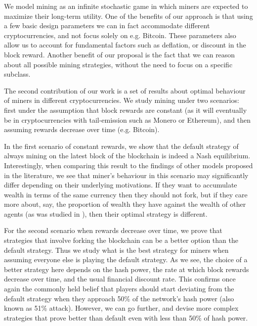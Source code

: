 \smallskip
{}  We model mining as an infinite stochastic game in which miners are expected to maximize their long-term utility. One of the benefits of our approach is that using  a few basic design parameters we can in fact accommodate different cryptocurrencies, and not focus solely on e.g. Bitcoin. These parameters also allow us to account for fundamental factors such as deflation, or discount in the block reward. Another benefit of our proposal is the fact that we can reason about all possible mining strategies, without the need to focus on a specific subclass. 

The second contribution of our work is a set of results about optimal behaviour of miners in different cryptocurrencies. We study mining under two scenarios: 
first under the assumption that block rewards are constant (as it will eventually be in cryptocurrencies with tail-emission such as Monero or Ethereum), and then 
assuming rewards decrease over time (e.g. Bitcoin). 

In the first scenario of constant rewards, we show that the default strategy of always mining on the latest block of the blockchain is indeed a Nash equilibrium. Interestingly, when comparing this result to the findings of other models proposed in the literature, we see that miner's behaviour in this scenario may significantly differ depending on their underlying motivations. If they want to accumulate wealth in terms of the same currency then they should not fork, but if they care more about, say, the proportion of wealth they have against the wealth of other agents (as was studied in \cite{mininggames:2016}), then their optimal strategy is different. 

For the second scenario when rewards decrease over time, we prove that strategies that involve forking the blockchain
can be a better option than the default strategy. 
Thus we study what is the best strategy for miners when assuming everyone else is playing the default strategy. As we see, the 
choice of a better strategy here depends on the hash power, the rate at which 
block rewards decrease over time, and the usual financial discount rate. This confirms once again the commonly held belief that
players should start deviating from the default strategy 
when they approach 50\% of the network's hash power (also known as 51\% attack). However, we can go further, and devise more complex strategies that 
prove better than default even with less than 50\% of hash power. 


